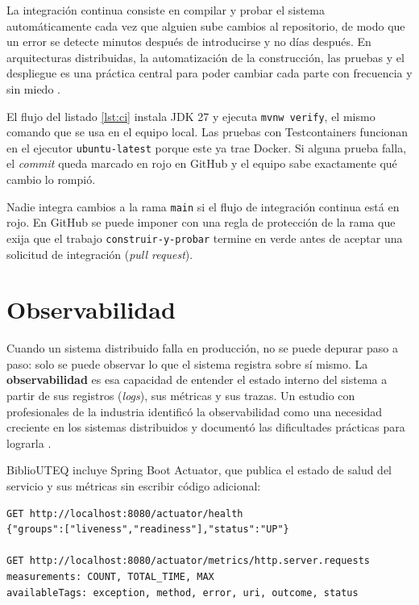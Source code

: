 La integración continua consiste en compilar y probar el sistema automáticamente cada vez que alguien sube cambios al repositorio, de modo que un error se detecte minutos después de introducirse y no días después. En arquitecturas distribuidas, la automatización de la construcción, las pruebas y el despliegue es una práctica central para poder cambiar cada parte con frecuencia y sin miedo \cite{waseem2020systematic}.



El flujo del listado \ref{lst:ci} instala JDK 27 y ejecuta \texttt{mvnw verify}, el mismo comando que se usa en el equipo local. Las pruebas con Testcontainers funcionan en el ejecutor \texttt{ubuntu-latest} porque este ya trae Docker. Si alguna prueba falla, el \emph{commit} queda marcado en rojo en GitHub y el equipo sabe exactamente qué cambio lo rompió.

\begin{avisoBox}[title={Una regla de trabajo en equipo}]
	Nadie integra cambios a la rama \texttt{main} si el flujo de integración continua está en rojo. En GitHub se puede imponer con una regla de protección de la rama que exija que el trabajo \texttt{construir-y-probar} termine en verde antes de aceptar una solicitud de integración (\emph{pull request}).
\end{avisoBox}

\section{Observabilidad}

Cuando un sistema distribuido falla en producción, no se puede depurar paso a paso: solo se puede observar lo que el sistema registra sobre sí mismo. La \textbf{observabilidad} es esa capacidad de entender el estado interno del sistema a partir de sus registros (\emph{logs}), sus métricas y sus trazas. Un estudio con profesionales de la industria identificó la observabilidad como una necesidad creciente en los sistemas distribuidos y documentó las dificultades prácticas para lograrla \cite{niedermaier2019observability}.

BiblioUTEQ incluye Spring Boot Actuator, que publica el estado de salud del servicio y sus métricas sin escribir código adicional:

\begin{lstlisting}[numbers=none,caption={Salud y una métrica del API en ejecución},label={lst:actuator}]
GET http://localhost:8080/actuator/health
{"groups":["liveness","readiness"],"status":"UP"}

GET http://localhost:8080/actuator/metrics/http.server.requests
measurements: COUNT, TOTAL_TIME, MAX
availableTags: exception, method, error, uri, outcome, status
\end{lstlisting}

